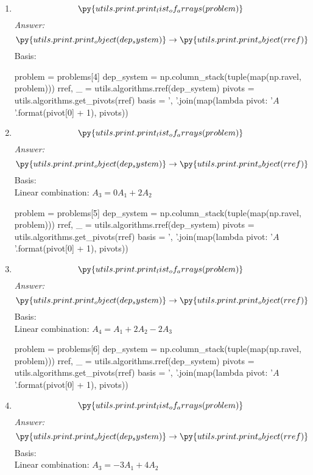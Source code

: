 \documentclass[letterpaper]{article}
\newcommand{\ans}{\textit{Answer: }}
\newenvironment{question}[2][Question]{\begin{trivlist}
\item[\hskip \labelsep {\bfseries #1}\hskip \labelsep {\bfseries #2.}]}{\end{trivlist}}
\newcommand{\printobj}[1]{\py{utils.print.print_object(#1)}}
\begin{document}
\begin{question}{2.1}
\begin{enumerate}[label=\textbf{(\alph*)}]
    \item
    $$\py{utils.print.print_list_of_arrays(problem)}$$
    \ans 
    $$\printobj{dep_system} \rightarrow \printobj{rref}$$
    Basis:  \\
    \begin{pycode}
problem = problems[4]
dep_system = np.column_stack(tuple(map(np.ravel, problem)))
rref, _ = utils.algorithms.rref(dep_system)
pivots = utils.algorithms.get_pivots(rref)
basis = ', '.join(map(lambda pivot: '$A_{}$'.format(pivot[0] + 1), pivots))
    \end{pycode}
    \item
    $$\py{utils.print.print_list_of_arrays(problem)}$$
    \ans 
    $$\printobj{dep_system} \rightarrow \printobj{rref}$$
    Basis:  \\
    Linear combination: $A_3 = 0A_1 + 2A_2$ \\
    \begin{pycode}
problem = problems[5]
dep_system = np.column_stack(tuple(map(np.ravel, problem)))
rref, _ = utils.algorithms.rref(dep_system)
pivots = utils.algorithms.get_pivots(rref)
basis = ', '.join(map(lambda pivot: '$A_{}$'.format(pivot[0] + 1), pivots))
    \end{pycode}
    \item
    $$\py{utils.print.print_list_of_arrays(problem)}$$
    \ans 
    $$\printobj{dep_system} \rightarrow \printobj{rref}$$
    Basis:  \\
    Linear combination: $A_4 = A_1 + 2A_2 - 2A_3$ \\ 
    \begin{pycode}
problem = problems[6]
dep_system = np.column_stack(tuple(map(np.ravel, problem)))
rref, _ = utils.algorithms.rref(dep_system)
pivots = utils.algorithms.get_pivots(rref)
basis = ', '.join(map(lambda pivot: '$A_{}$'.format(pivot[0] + 1), pivots))
    \end{pycode}
    \item
    $$\py{utils.print.print_list_of_arrays(problem)}$$
    \ans 
    $$\printobj{dep_system} \rightarrow \printobj{rref}$$
    Basis:  \\
    Linear combination: $A_3 = -3A_1 + 4A_2$ \\

\end{enumerate}
\end{question}
\end{document}

